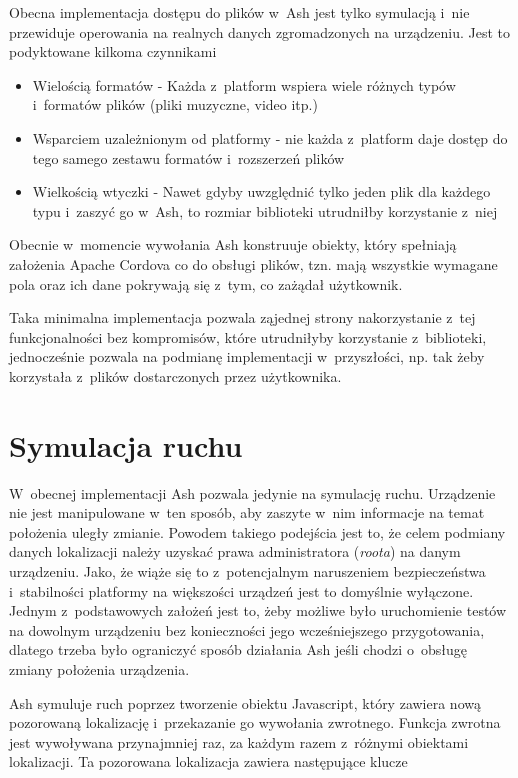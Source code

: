 \documentclass[brudnopis]{xmgr}
\begin{document}
Obecna implementacja dostępu do plików w~Ash jest tylko symulacją i~nie przewiduje operowania na realnych danych zgromadzonych na urządzeniu. Jest to podyktowane kilkoma czynnikami

\begin{itemize}
  \item Wielością formatów - Każda z~platform wspiera wiele różnych typów i~formatów plików (pliki muzyczne, video itp.) 
  \item Wsparciem uzależnionym od platformy - nie każda z~platform daje dostęp do tego samego zestawu formatów i~rozszerzeń plików
  \item Wielkością wtyczki - Nawet gdyby uwzględnić tylko jeden plik dla każdego typu i~zaszyć go w~Ash, to rozmiar biblioteki utrudniłby korzystanie z~niej
\end{itemize}

Obecnie w~momencie wywołania Ash konstruuje obiekty, który spełniają założenia Apache Cordova co do obsługi plików, tzn. mają wszystkie wymagane pola oraz ich dane pokrywają się z~tym, co zażądał użytkownik. 

Taka minimalna implementacja pozwala ząjednej strony  nakorzystanie z~tej funkcjonalności bez kompromisów, które utrudniłyby korzystanie z~biblioteki, jednocześnie pozwala na podmianę implementacji w~przyszłości, np. tak żeby korzystała z~plików dostarczonych przez użytkownika.

\section{Symulacja ruchu}

W~obecnej implementacji Ash pozwala jedynie na symulację ruchu. Urządzenie nie jest manipulowane w~ten sposób, aby zaszyte w~nim informacje na temat położenia uległy zmianie. Powodem takiego podejścia jest to, że celem podmiany danych lokalizacji należy uzyskać prawa administratora (\textit{roota}) na danym urządzeniu. Jako, że wiąże się to z~potencjalnym naruszeniem bezpieczeństwa i~stabilności platformy na większości urządzeń jest to domyślnie wyłączone. Jednym z~podstawowych założeń jest to, żeby możliwe było uruchomienie testów na dowolnym urządzeniu bez konieczności jego wcześniejszego przygotowania, dlatego trzeba było ograniczyć sposób działania Ash jeśli chodzi o~obsługę zmiany położenia urządzenia. 

Ash symuluje ruch poprzez tworzenie obiektu Javascript, który zawiera nową pozorowaną lokalizację i~przekazanie go wywołania zwrotnego. Funkcja zwrotna jest wywoływana przynajmniej raz, za każdym razem z~różnymi obiektami lokalizacji. Ta pozorowana lokalizacja zawiera następujące klucze
\end{document}

